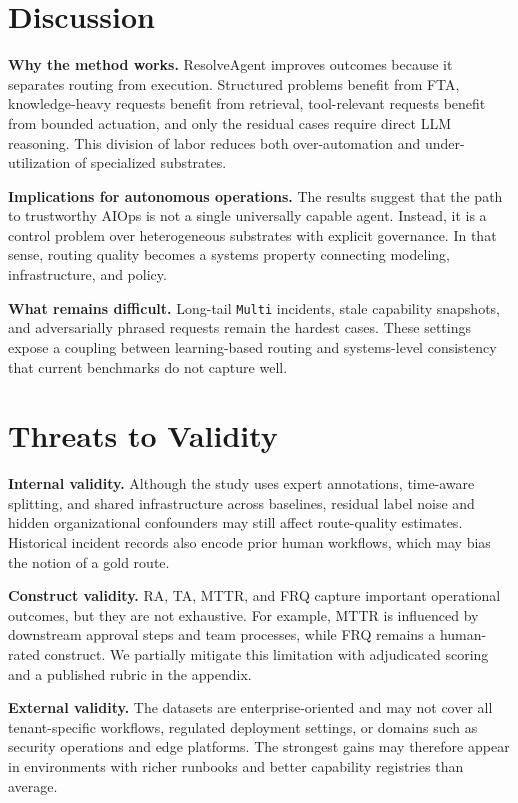 \documentclass[conference]{IEEEtran}
\begin{document}
\section{Discussion}
\textbf{Why the method works.} ResolveAgent improves outcomes because it separates routing from execution. Structured problems benefit from FTA, knowledge-heavy requests benefit from retrieval, tool-relevant requests benefit from bounded actuation, and only the residual cases require direct LLM reasoning. This division of labor reduces both over-automation and under-utilization of specialized substrates.

\textbf{Implications for autonomous operations.} The results suggest that the path to trustworthy AIOps is not a single universally capable agent. Instead, it is a control problem over heterogeneous substrates with explicit governance. In that sense, routing quality becomes a systems property connecting modeling, infrastructure, and policy.

\textbf{What remains difficult.} Long-tail \texttt{Multi} incidents, stale capability snapshots, and adversarially phrased requests remain the hardest cases. These settings expose a coupling between learning-based routing and systems-level consistency that current benchmarks do not capture well.

\section{Threats to Validity}
\textbf{Internal validity.} Although the study uses expert annotations, time-aware splitting, and shared infrastructure across baselines, residual label noise and hidden organizational confounders may still affect route-quality estimates. Historical incident records also encode prior human workflows, which may bias the notion of a gold route.

\textbf{Construct validity.} RA, TA, MTTR, and FRQ capture important operational outcomes, but they are not exhaustive. For example, MTTR is influenced by downstream approval steps and team processes, while FRQ remains a human-rated construct. We partially mitigate this limitation with adjudicated scoring and a published rubric in the appendix.

\textbf{External validity.} The datasets are enterprise-oriented and may not cover all tenant-specific workflows, regulated deployment settings, or domains such as security operations and edge platforms. The strongest gains may therefore appear in environments with richer runbooks and better capability registries than average.
\end{document}
